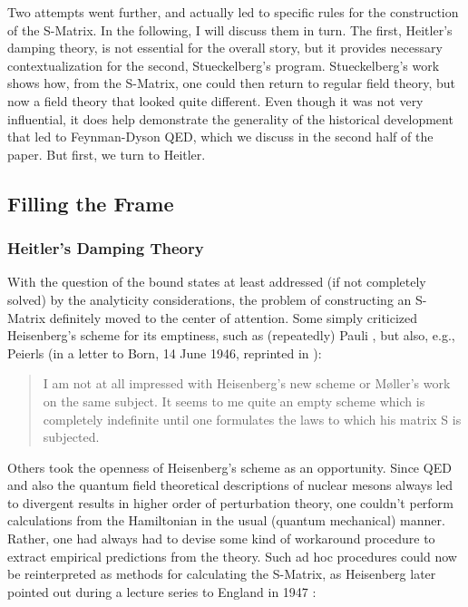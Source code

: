 \documentclass[12pt,a4paper]{article}
\begin{document}
Two attempts went further, and actually led to specific rules for the construction of the S-Matrix. In the following, I will discuss them in turn. The first, Heitler's damping theory, is not essential for the overall story, but it provides necessary contextualization for the second, Stueckelberg's program. Stueckelberg's work shows how, from the S-Matrix, one could then return to regular field theory, but now a field theory that looked quite different. Even though it was not very influential, it does help demonstrate the generality of the historical development that led to Feynman-Dyson QED, which we discuss in the second half of the paper. But first, we turn to Heitler.

\subsection{Filling the Frame}

\subsubsection{Heitler's Damping Theory}

With the question of the bound states at least addressed (if not completely solved) by the analyticity considerations, the problem of constructing an S-Matrix definitely moved to the center of attention. Some simply criticized Heisenberg's scheme for its emptiness, such as (repeatedly) Pauli \citep[p. 564-567]{rechenberg_1989_the-early}, but also, e.g., Peierls (in a letter to Born, 14 June 1946, reprinted in \citep[p. 58]{lee_2009_sir}):

\begin{quote}
I am not at all impressed with Heisenberg's new scheme or M\o ller's work on the same subject. It seems to me quite an empty scheme which is completely indefinite until one formulates the laws to which his matrix S is subjected.
\end{quote}

Others took the openness of Heisenberg's scheme as an opportunity. Since QED and also the quantum field theoretical descriptions of nuclear mesons always led to divergent results in higher order of perturbation theory, one couldn't perform calculations from the Hamiltonian in the usual (quantum mechanical) manner. Rather, one had always had to devise some kind of workaround procedure to extract empirical predictions from the theory. Such ad hoc procedures could now be reinterpreted as methods for calculating the S-Matrix, as Heisenberg later pointed out during a lecture series to England in 1947 \citep[p. 20]{heisenberg_1949_the-present}:
\end{document}
